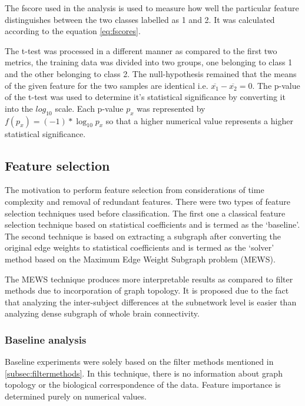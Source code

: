 \documentclass[msthesis.tex]{subfiles}
\begin{document}
The fscore used in the analysis is used to measure how well the particular feature distinguishes between the two classes labelled as 1 and 2. It was calculated according to the equation \autoref{eq:fscores}. 

The t-test was processed in a different manner as compared to the first two metrics, the training data was divided into two groups, one belonging to class 1 and the other belonging to class 2. The null-hypothesis remained that the means of the given feature for the two samples are identical i.e. $\overline{x_{1}} - \overline{x_{2}} = 0$. The p-value of the t-test was used to determine it's statistical significance by converting it into the $log_{10}$ scale. Each p-value $p_x$ was represented by $ f(p_{x}) = (-1)*\log_{10} p_x$ so that a higher numerical value represents a higher statistical significance.



\subsection{Feature selection} 
The motivation to perform feature selection from considerations of time complexity and removal of redundant features. There were two types of feature selection techniques used before classification. The first one a classical feature selection technique based on statistical coefficients and is termed as the `baseline'. The second technique is based on extracting a subgraph after converting the original edge weights to statistical coefficients and is termed as the `solver' method based on the Maximum Edge Weight Subgraph problem (MEWS). 

The MEWS technique produces more interpretable results as compared to filter methods due to incorporation of graph topology. It is proposed due to the fact that analyzing the inter-subject differences at the subnetwork level is easier than analyzing dense subgraph of whole brain connectivity. 

\subsubsection{Baseline analysis}

Baseline experiments were solely based on the filter methods mentioned in \autoref{subsec:filtermethods}. In this technique, there is no information about graph topology or the biological correspondence of the data. Feature importance is determined purely on numerical values.
\end{document}
